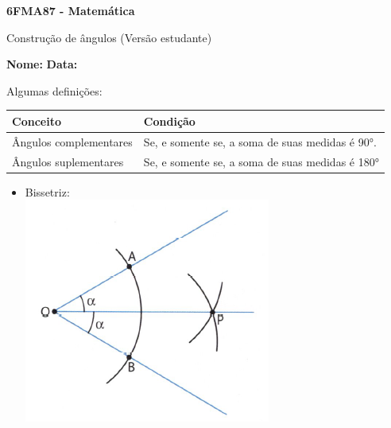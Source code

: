 \documentclass[a4paper,14pt]{article}
\begin{document}
	
	\noindent\textbf{6FMA87 - Matemática} 
	
	\begin{center}Construção de ângulos (Versão estudante)
	\end{center}
	
	\noindent\textbf{Nome:} \underline{\hspace{10cm}}
	\noindent\textbf{Data:} \underline{\hspace{4cm}}
	
	
	\begin{multicols}{2}
		\noindent Algumas definições: \\
		\begin{table}[H]
			\begin{tabular}{|p{37mm}|p{37mm}|}
				\hline
				\textbf{Conceito} & \textbf{Condição} \\ \hline
				Ângulos complementares & Se, e somente se, a soma de suas medidas é 90°. \\ \hline
				Ângulos suplementares & Se, e somente se, a soma de suas medidas é 180° \\ \hline
			\end{tabular}
		\end{table}
		\begin{itemize}
			\item Bissetriz: \\
			\includegraphics[width=1\linewidth]{6FMA87_imagens/imagem1}

\end{itemize}
\end{multicols}
\end{document}
